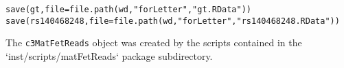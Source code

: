 \documentclass{article}\usepackage[]{graphicx}\usepackage[]{color}
\makeatletter
\newcommand{\hlstr}[1]{\textcolor[rgb]{0.063,0.58,0.627}{#1}}%
\newcommand{\hlstd}[1]{\textcolor[rgb]{0.196,0.196,0.196}{#1}}%
\newcommand{\hlkwc}[1]{\textcolor[rgb]{0,0.631,0.314}{#1}}%
\newcommand{\hlkwd}[1]{\textcolor[rgb]{0.78,0.227,0.412}{#1}}%
\newenvironment{kframe}{%
 \def\at@end@of@kframe{}%
 \ifinner\ifhmode%
  \def\at@end@of@kframe{\end{minipage}}%
  \begin{minipage}{\columnwidth}%
 \fi\fi%
 \def\FrameCommand##1{\hskip\@totalleftmargin \hskip-\fboxsep
 \colorbox{shadecolor}{##1}\hskip-\fboxsep
     \hskip-\linewidth \hskip-\@totalleftmargin \hskip\columnwidth}%
 \MakeFramed {\advance\hsize-\width
   \@totalleftmargin\z@ \linewidth\hsize
   \@setminipage}}%
 {\par\unskip\endMakeFramed%
 \at@end@of@kframe}
\newenvironment{knitrout}{}{} %
\makeatother
\begin{document}
\begin{knitrout}
\begin{kframe}
\begin{alltt}
\hlkwd{save}\hlstd{(gt,} \hlkwc{file} \hlstd{=} \hlkwd{file.path}\hlstd{(wd,} \hlstr{"forLetter"}\hlstd{,} \hlstr{"gt.RData"}\hlstd{))}
\hlkwd{save}\hlstd{(rs140468248,} \hlkwc{file} \hlstd{=} \hlkwd{file.path}\hlstd{(wd,} \hlstr{"forLetter"}\hlstd{,} \hlstr{"rs140468248.RData"}\hlstd{))}
\end{alltt}
\end{kframe}
\end{knitrout}

The \texttt{c3MatFetReads} object was created by the scripts contained in the `inst/scripts/matFetReads` package subdirectory.
\end{document}
